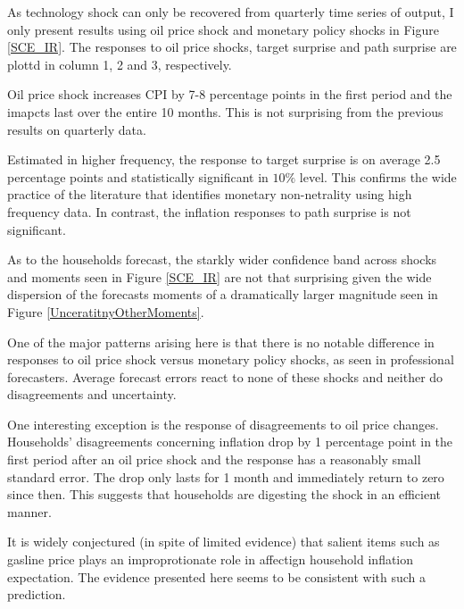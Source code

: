 \documentclass[]{article}
\begin{document}
As technology shock can only be recovered from quarterly time series of output, I only present results using oil price shock and monetary policy shocks in Figure \ref{SCE_IR}. The responses to oil price shocks, target surprise and path surprise are plottd in column 1, 2 and 3, respectively. 

Oil price shock increases CPI by  7-8 percentage points in the first period and the imapcts last over the entire 10 months. This is not surprising from the previous results on quarterly data. 

Estimated in higher frequency, the response to target surprise is on average 2.5 percentage points and statistically significant in $10\%$ level. This confirms the wide practice of the literature that identifies monetary non-netrality using high frequency data. In contrast, the inflation responses to path surprise is not significant. 

As to the households forecast, the starkly wider confidence band across  shocks and moments seen in Figure \ref{SCE_IR} are not that surprising given the wide dispersion of the forecasts moments of a dramatically larger magnitude seen in Figure \ref{UnceratitnyOtherMoments}.  

One of the major patterns arising here is that there is no notable difference in responses to oil price shock versus monetary policy shocks, as seen in professional forecasters.  Average forecast errors react to none of these shocks and neither do disagreements and uncertainty.  

One interesting exception is the response of disagreements to oil price changes. Households' disagreements concerning inflation drop by 1 percentage point in the first period after an oil price shock and the response has a reasonably small standard error. The drop only lasts for 1 month and immediately return to zero since then. This suggests that households are digesting the shock in an efficient manner.  

It is widely conjectured (in spite of limited evidence) that salient items such as gasline price plays an improprotionate role in affectign household inflation expectation. The evidence presented here seems to be consistent with such a prediction. 
\end{document}
